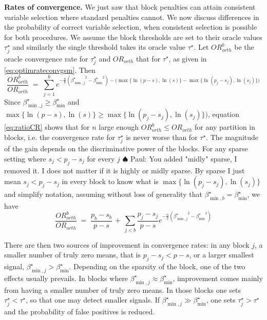 \documentclass[aos]{imsart}
\theoremstyle{plain}
\newcommand{\paul}[1]{{\small{\color{green} \sf $\spadesuit$ Paul: #1}}}
\begin{document}
\noindent\textbf{Rates of convergence.}   We just saw that block penalties can attain consistent variable selection where standard penalties cannot. We now discuss differences in the probability of correct variable selection, when consistent selection is possible for both procedures. We assume the block thresholds 
are set to their oracle values $\tau_j^\star$ 
and similarly the single threshold
takes its oracle value $\tau^\star$.
Let ${OR}^b_{orth}$ be the oracle convergence rate for $\tau_j^\star$
and ${OR}_{orth}$ that for $\tau^\star$, as given in \eqref{eq:optimrateconvgsm}.
Then
\begin{equation}\label{eq:ratioCR}
    \frac{{OR}^b_{orth}}{{OR}_{orth}}\;=\;\sum_{j=1}^be^{-\frac{n}{8}\left({\beta^\star_{\min,j}}^2-{\beta_{\min}^\star}^2\right)-(\max\{\ln(p-s),\ln(s)\}-\max\{\ln(p_j-s_j),\ln(s_j)\}\big)}
\end{equation}
Since $\beta_{\min,j}^\star \geq \beta_{\min}^\star$ and $\max\{\ln(p-s),\ln(s)\}\geq\max\{\ln(p_j-s_j),\ln(s_j)\}\big)$, equation \eqref{eq:ratioCR} shows that for $n$ large enough ${OR}^b_{orth} \leq {OR}_{orth}$ for any partition in blocks, i.e. the convergence rate for $\tau_j^\star$ is never worse than for $\tau^\star$. The magnitude of the gain depends on the discriminative power of the blocks.
For any sparse setting where $s_j<p_j-s_j$ for every $j$\paul{You added "midly" sparse, I removed it. I does not matter if it is highly or midly sparse. By sparse I just mean $s_j<p_j-s_j$ in every block to know what is $\max\{\ln(p_j-s_j),\ln(s_j)\}$ and simplify notation}, assuming without loss of generality that $\beta_{\min,b}^\star=\beta_{\min}^\star$, we have
\begin{equation*}
    \frac{{OR}^b_{orth}}{{OR}_{orth}}\;=\; \frac{p_b-s_b}{p-s} \,+\,\sum_{j<b}\frac{p_j-s_j}{p-s}e^{-\frac{n}{2}\left({\beta^\star_{\min,j}}^2-{\beta_{\min}^\star}^2\right)}
\end{equation*}

There are then two sources of improvement in convergence rates: in any block $j$, a smaller number of truly zero means, that is $p_j-s_j< p-s$, or a larger smallest signal, $\beta^\star_{\min,j} > \beta_{\min}^\star$. Depending on the sparsity of the block, one of the two effects usually prevails. In blocks where $\beta^\star_{\min,j} \approx \beta_{\min}^\star$, improvement comes mainly from having a smaller number of truly zero means. In those blocks
one sets $\tau^\star_j < \tau^\star$, so that one may detect smaller signals. 
If
$\beta^\star_{\min,j} \gg \beta_{\min}^\star$,
one sets $\tau^\star_j > \tau^\star$
and the probability of false positives is reduced.
\end{document}
